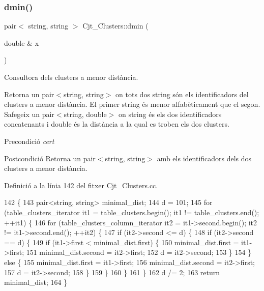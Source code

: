 \subsubsection{\texorpdfstring{dmin()}{dmin()}}
{\footnotesize\ttfamily pair$<$ string, string $>$ Cjt\+\_\+\+Clusters\+::dmin (\begin{DoxyParamCaption}\item[{double \&}]{x }\end{DoxyParamCaption})}



Consultora dels clusters a menor distància. 

Retorna un pair$<$string, string$>$ on tots dos string són els identificadors del clusters a menor distància. El primer string és menor alfabèticament que el segon. S\textquotesingle{}afegeix un pair$<$string, double$>$ on string és els dos identificadors concatenants i double és la distància a la qual es troben els dos clusters.

\begin{DoxyPrecond}{Precondició}
{\itshape cert} 
\end{DoxyPrecond}
\begin{DoxyPostcond}{Postcondició}
Retorna un pair$<$string, string$>$ amb els identificadors dels dos clusters a menor distància. 
\end{DoxyPostcond}


Definició a la línia 142 del fitxer Cjt\+\_\+\+Clusters.\+cc.


\begin{DoxyCode}
142                                                 \{
143     pair<string, string> minimal\_dist;
144     d = 101;
145     \textcolor{keywordflow}{for} (table\_clusters\_iterator it1 = table\_clusters.begin(); it1 != table\_clusters.end(); ++it1) \{
146         \textcolor{keywordflow}{for} (table\_clusters\_column\_iterator it2 = it1->second.begin(); it2 != it1->second.end(); ++it2) \{
147             \textcolor{keywordflow}{if} (it2->second <= d) \{
148                 \textcolor{keywordflow}{if} (it2->second == d) \{
149                     \textcolor{keywordflow}{if} (it1->first < minimal\_dist.first) \{
150                         minimal\_dist.first = it1->first;
151                         minimal\_dist.second = it2->first;
152                         d = it2->second;
153                     \}
154                 \} \textcolor{keywordflow}{else} \{
155                     minimal\_dist.first = it1->first;
156                     minimal\_dist.second = it2->first;
157                     d = it2->second;
158                 \}
159             \}              
160         \}
161     \}
162     d /= 2;
163     \textcolor{keywordflow}{return} minimal\_dist;
164 \}
\end{DoxyCode}
\mbox{\label{class_cjt___clusters_aaa57cbd8d86567b4403ac9adb34a87f5}} 
